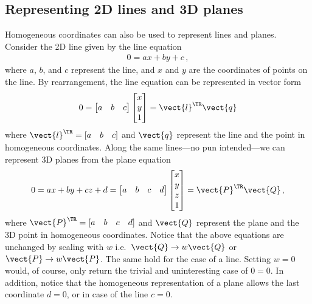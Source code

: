 \documentclass[oneandhalfcolumn]{coursenotes-handout}
\begin{document}
\begin{exercise}
\end{exercise}

\subsection{Representing 2D lines and 3D planes}\label{sec:homogeneous-coords-lines-planes}

Homogeneous coordinates can also be used to represent lines and planes. Consider the 2D line given by the line equation
\begin{align}
0 = a x + b y + c \,,
\end{align}
where \(a\), \(b\), and \(c\) represent the line, and \(x\) and \(y\) are the coordinates of points on the line. By rearrangement, the line equation can be represented in vector form
\begin{align}
0 = \begin{bmatrix}a & b & c\end{bmatrix} \begin{bmatrix}x \\ y \\ 1\end{bmatrix} \label{eq:line.eq}
  = \vect{l}^{\TR} \vect{q}
\end{align}
where \(\vect{l}^{\TR} = [\begin{matrix}a & b & c\end{matrix}]\) and \(\vect{q}\) represent the line and the point in homogeneous coordinates. Along the same lines---no pun intended---we can represent 3D planes from the plane equation
\begin{align}
0 = a x + b y + c z + d
  = \begin{bmatrix}a & b & c & d\end{bmatrix} \begin{bmatrix}x \\ y \\ z \\ 1\end{bmatrix} \label{eq:plane.eq}
  = \vect{P}^{\TR} \vect{Q} \,,
\end{align}
where \(\vect{P}^{\TR} = [\begin{matrix}a & b & c & d\end{matrix}]\)  and \(\vect{Q}\) represent the plane and the 3D point in homogeneous coordinates. Notice that the above equations are unchanged by scaling with \(w\) i.e.\ \(\vect{Q} \to w\vect{Q}\) or \(\vect{P} \to w\vect{P}\). The same hold for the case of a line. Setting \(w = 0\) would, of course, only return the trivial and uninteresting case of \(0 = 0\). In addition, notice that the homogeneous representation of a plane allows the last coordinate \(d = 0\), or in case of the line \(c = 0\).
\end{document}

